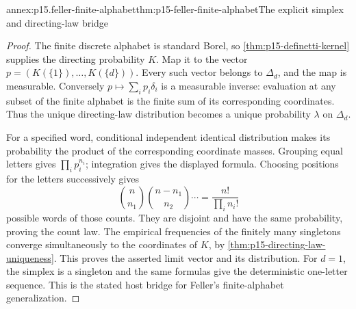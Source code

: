 \begin{annexitem}{annex:p15.feller-finite-alphabet}{thm:p15-feller-finite-alphabet}{The explicit simplex and directing-law bridge}
\begin{proof}
The finite discrete alphabet is standard Borel, so
\cref{thm:p15-definetti-kernel} supplies the directing probability
\(K\). Map it to the vector
\(p=(K(\{1\}),\ldots,K(\{d\}))\).
Every such vector belongs to \(\Delta_d\), and the map is measurable.
Conversely \(p\mapsto\sum_i p_i\delta_i\) is a measurable inverse:
evaluation at any subset of the finite alphabet is the finite sum
of its corresponding coordinates.
Thus the unique directing-law distribution becomes a unique probability
\(\lambda\) on \(\Delta_d\).

For a specified word, conditional independent identical distribution
makes its probability the product of the corresponding coordinate
masses. Grouping equal letters gives \(\prod_i p_i^{n_i}\);
integration gives the displayed formula.
Choosing positions for the letters successively gives
\[
             \binom n{n_1}\binom{n-n_1}{n_2}\cdots
                            =\frac{n!}{\prod_i n_i!}
\]
possible words of those counts.
They are disjoint and have the same probability, proving the count law.
The empirical frequencies of the finitely many singletons converge
simultaneously to the coordinates of \(K\), by
\cref{thm:p15-directing-law-uniqueness}.
This proves the asserted limit vector and its distribution.
For \(d=1\), the simplex is a singleton and the same formulas give
the deterministic one-letter sequence.
This is the stated host bridge for Feller's finite-alphabet generalization.
\end{proof}
\end{annexitem}

